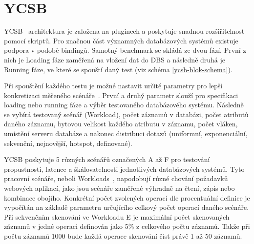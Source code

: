 \documentclass[czech,master,dept460,male,csharp,cpdeclaration]{diploma}
\begin{document}
	\section{YCSB} \label{lab-ycsb}
	
	YCSB~\cite{ycsb,ycsb-benchmarking} architektura je založena na pluginech a poskytuje snadnou rozšiřitelnost pomocí skriptů. Pro značnou část významných databázových systémů existuje podpora v podobě bindingů. Samotný benchmark se skládá ze dvou fází. První z nich je Loading fáze zaměřená na vložení dat do DBS a následně druhá je Running fáze, ve které se spouští daný test (viz schéma \ref{ycsb-blok-schema}).
	
	Při spouštění každého testu je možné nastavit určité parametry pro lepší konkretizaci měřeného scénáře~\cite{ytb-ycsb}. První a druhý parametr slouží pro specifikaci loading nebo running fáze a výběr testovaného databázového systému. Následně se vybírá testovaný scénář (Workload), počet záznamů v databázi, počet atributů daného záznamu, bytovou velikost každého atributu v záznamu, počet vláken, umístění serveru databáze a nakonec distribuci dotazů (uniformní, exponenciální, sekvenční, nejnovější, hotspot, definované).
	
	YCSB poskytuje 5 různých scénářů označených A až F pro testování propustnosti, latence a škálovatelnosti jednotlivých databázových systémů. Tyto pracovní scénáře, neboli Workloads~\cite{benchmark-pdf-1, workloads}, napodobují různé chování požadavků webových aplikací, jako jsou scénáře zaměřené výhradně na čtení, zápis nebo kombinace obojího. Konkrétní počet zvolených operací dle procentuální definice je vypočítán na základě parametru určujícího celkový počet operací daného scénáře. Při sekvenčním skenování ve Workloadu E je maximální počet skenovaných záznamů v jedné operaci definován jako 5\% z celkového počtu záznamů. Takže při počtu záznamů 1000 bude každá operace skenování číst právě 1 až 50 záznamů.
	
\end{document}
